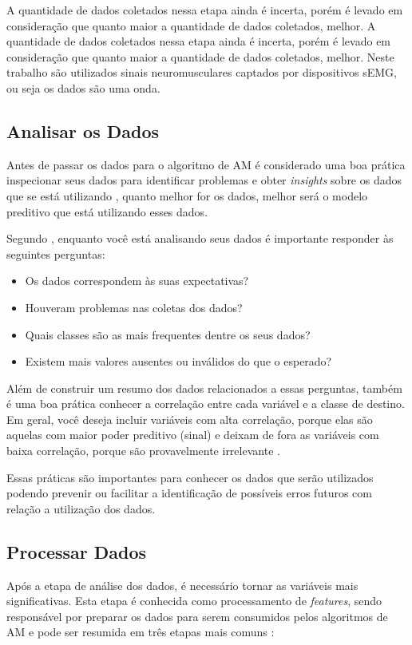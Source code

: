 A quantidade de dados coletados nessa etapa ainda é incerta, porém é levado em consideração que quanto maior a quantidade de dados coletados, melhor. A quantidade de dados coletados nessa etapa ainda é incerta, porém é levado em consideração que quanto maior a quantidade de dados coletados, melhor. Neste trabalho são utilizados sinais neuromusculares captados por dispositivos sEMG, ou seja os dados são uma onda. 

\subsection{Analisar os Dados}

Antes de passar os dados para o algoritmo de AM é considerado uma boa prática inspecionar seus dados para identificar problemas e obter \textit{insights} sobre os dados que se está utilizando \cite{Amazon}, quanto melhor for os dados, melhor será o modelo preditivo que está utilizando esses dados.

Segundo , enquanto você está analisando seus dados é importante responder às seguintes perguntas:
\begin{itemize}  
    \item Os dados correspondem às suas expectativas?
    \item Houveram problemas nas coletas dos dados?
    \item Quais classes são as mais frequentes dentre os seus dados?
    \item Existem mais valores ausentes ou inválidos do que o esperado?
\end{itemize}

Além de construir um resumo dos dados relacionados a essas perguntas, também é uma boa prática conhecer a correlação entre cada variável e a classe de destino. Em geral, você deseja incluir variáveis com alta correlação, porque elas são aquelas com maior poder preditivo (sinal) e deixam de fora as variáveis com baixa correlação, porque são provavelmente irrelevante \cite{Amazon}. 

Essas práticas são importantes para conhecer os dados que serão utilizados podendo prevenir ou facilitar a identificação de possíveis erros futuros com relação a utilização dos dados.

\subsection{Processar Dados}

Após a etapa de análise dos dados, é necessário tornar as variáveis mais significativas. Esta etapa é conhecida como processamento de \textit{features}, sendo responsável por preparar os dados para serem consumidos pelos algoritmos de AM e pode ser resumida em três etapas mais comuns \cite{blum1997selection}:


